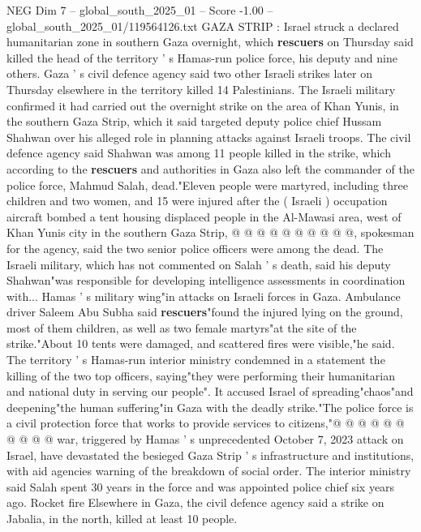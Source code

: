 \begin{textsample}{NEG Dim 7 – global\_south\_2025\_01 – Score -1.00 – global\_south\_2025\_01/119564126.txt}  \label{ex:f7_neg_117}
GAZA STRIP : Israel struck a declared humanitarian zone in southern Gaza overnight, which \textbf{rescuers} on Thursday said killed the head of the territory ' s Hamas-run police force, his deputy and nine others.
Gaza ' s civil defence agency said two other Israeli strikes later on Thursday elsewhere in the territory killed 14 Palestinians.
The Israeli military confirmed it had carried out the overnight strike on the area of Khan Yunis, in the southern Gaza Strip, which it said targeted deputy police chief Hussam Shahwan over his alleged role in planning attacks against Israeli troops.
The civil defence agency said Shahwan was among 11 people killed in the strike, which according to the \textbf{rescuers} and authorities in Gaza also left the commander of the police force, Mahmud Salah, dead."Eleven people were martyred, including three children and two women, and 15 were injured after the ( Israeli ) occupation aircraft bombed a tent housing displaced people in the Al-Mawasi area, west of Khan Yunis city in the southern Gaza Strip, @ @ @ @ @ @ @ @ @ @, spokesman for the agency, said the two senior police officers were among the dead.
The Israeli military, which has not commented on Salah ' s death, said his deputy Shahwan"was responsible for developing intelligence assessments in coordination with...
Hamas ' s military wing"in attacks on Israeli forces in Gaza.
Ambulance driver Saleem Abu Subha said \textbf{rescuers}"found the injured lying on the ground, most of them children, as well as two female martyrs"at the site of the strike."About 10 tents were damaged, and scattered fires were visible,"he said.
The territory ' s Hamas-run interior ministry condemned in a statement the killing of the two top officers, saying"they were performing their humanitarian and national duty in serving our people".
It accused Israel of spreading"chaos"and deepening"the human suffering"in Gaza with the deadly strike."The police force is a civil protection force that works to provide services to citizens,"@ @ @ @ @ @ @ @ @ @ war, triggered by Hamas ' s unprecedented October 7, 2023 attack on Israel, have devastated the besieged Gaza Strip ' s infrastructure and institutions, with aid agencies warning of the breakdown of social order.
The interior ministry said Salah spent 30 years in the force and was appointed police chief six years ago.
Rocket fire Elsewhere in Gaza, the civil defence agency said a strike on Jabalia, in the north, killed at least 10 people.

\end{textsample}
